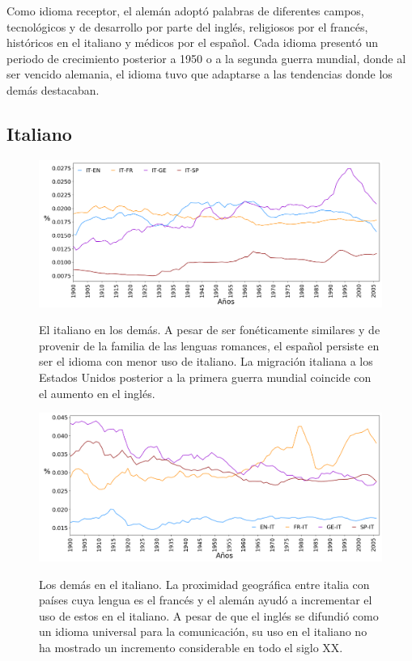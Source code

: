 Como idioma receptor, el alemán adoptó palabras de diferentes campos, tecnológicos y de desarrollo por parte del inglés,  religiosos  por el francés, históricos en el italiano y médicos por el español.  Cada idioma presentó un periodo de crecimiento posterior a 1950  o a la segunda guerra mundial, donde al ser vencido alemania, el idioma tuvo que adaptarse a las tendencias donde los demás destacaban. 

\clearpage
\subsection{Italiano}

\begin{figure}
	\centering
	\includegraphics[scale=.36]{Cap_4/PF1_S2_IT.png}
	\label{fig.ST_a_IT}
	\caption{El italiano en los demás. A pesar de ser fonéticamente similares y de provenir de la familia de las lenguas romances,  el español persiste en ser el idioma con menor uso de italiano. La migración italiana a los Estados Unidos posterior a la primera guerra mundial coincide con el aumento en el inglés. }
\end{figure}
		
\begin{figure}[h!]
	\centering
	\includegraphics[scale=.36]{Cap_4/PF2_S2_IT.png}
	\label{fig.ST_b_IT}
	\caption{Los demás en el italiano. La proximidad geográfica  entre italia con países cuya lengua es el francés y el alemán ayudó a incrementar el uso de estos en el italiano. A pesar de que el inglés se difundió como un idioma universal para la comunicación, su uso en el italiano no ha mostrado un incremento considerable en todo el siglo XX. }
\end{figure}

